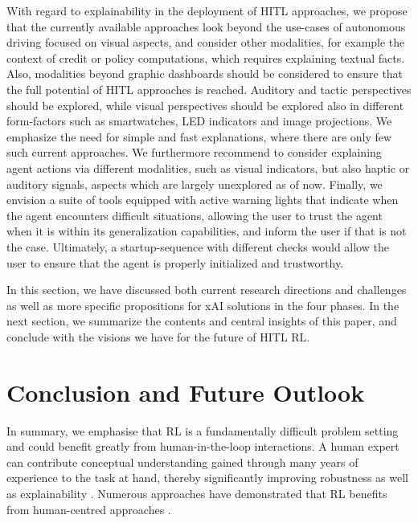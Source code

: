 \documentclass[twoside,11pt]{article}
\begin{document}
\begin{enumerate}

With regard to explainability in the deployment of HITL approaches, we propose that the currently available approaches look beyond the use-cases of autonomous driving focused on visual aspects, and consider other modalities, for example the context of credit or policy computations, which requires explaining textual facts. Also, modalities beyond graphic dashboards should be considered to ensure that the full potential of HITL approaches is reached. Auditory and tactic perspectives should be explored, while visual perspectives should be explored also in different form-factors such as smartwatches, LED indicators and image projections.
We emphasize the need for simple and fast explanations, where there are only few such current approaches. We furthermore recommend to consider explaining agent actions via different modalities, such as visual indicators, but also haptic or auditory signals, aspects which are largely unexplored as of now. Finally, we envision a suite of tools equipped with active warning lights that indicate when the agent encounters difficult situations, allowing the user to trust the agent when it is within its generalization capabilities, and inform the user if that is not the case. Ultimately, a startup-sequence with different checks would allow the user to ensure that the agent is properly initialized and trustworthy.

In this section, we have discussed both current research directions and challenges as well as more specific propositions for xAI solutions in the four phases. In the next section, we summarize the contents and central insights of this paper, and conclude with the visions we have for the future of HITL RL.

\section{Conclusion and Future Outlook}
\label{sec:conclusion}
In summary, we emphasise that RL is a fundamentally difficult problem setting and could benefit greatly from human-in-the-loop interactions. A human expert can contribute conceptual understanding gained through many years of experience to the task at hand, thereby significantly improving robustness as well as explainability \citep{Holzinger:2021:TrustAI}. Numerous approaches have demonstrated that RL benefits from human-centred approaches \citep{Li:2019:HumanCenteredRLSurvey,MatthewsonPilarski:2022:DesigningAndEvaluatingHCIML}.


\end{enumerate}
\end{document}
